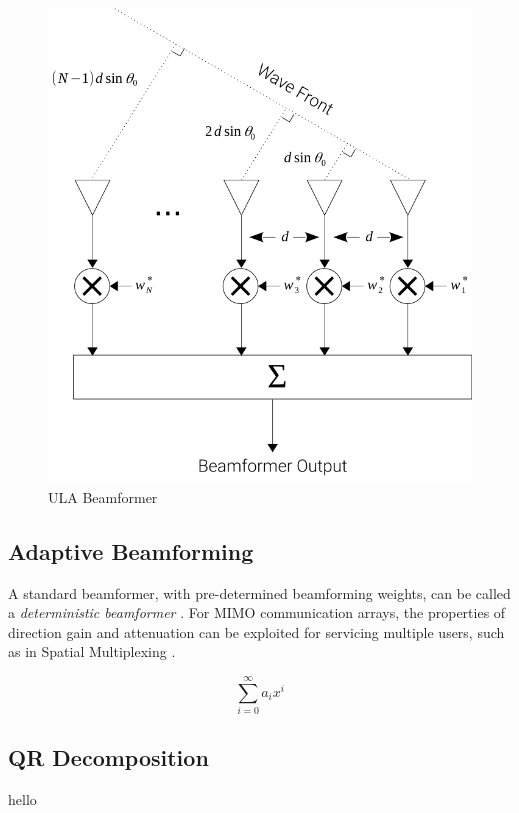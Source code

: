 \begin{figure}[!htbp]
  \centering
  \includegraphics[]{02_abf_background/ula_beamformer}
  \caption{ULA Beamformer}
  \label{fig:ula_beamformer}
\end{figure}

\subsection{Adaptive Beamforming}

A standard beamformer, with pre-determined beamforming weights, can be called a \emph{deterministic beamformer} \citep{6206403}. For MIMO communication arrays, the properties of direction gain and attenuation can be exploited for servicing multiple users, such as in Spatial Multiplexing \citep{6732923}.

\begin{equation} \label{eq:test}
  \sum_{i=0}^{\infty} a_i x^i
\end{equation}

\subsection{QR Decomposition}

hello \citep{AN506}


